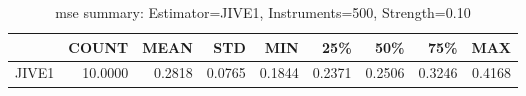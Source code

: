 \begin{table}[ht]
\centering
\caption{mse summary: Estimator=JIVE1, Instruments=500, Strength=0.10}
\begin{tabular}{lrrrrrrrr}
\toprule
 & COUNT & MEAN & STD & MIN & 25\% & 50\% & 75\% & MAX \\
\midrule
JIVE1 & 10.0000 & 0.2818 & 0.0765 & 0.1844 & 0.2371 & 0.2506 & 0.3246 & 0.4168 \\
\bottomrule
\end{tabular}
\end{table}
